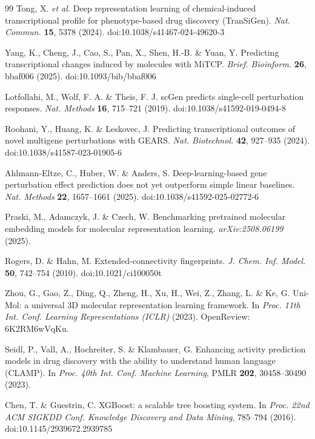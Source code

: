 \documentclass[11pt]{article}
\begin{document}
\begin{thebibliography}{99}
Tong, X. \textit{et al.} Deep representation learning of chemical-induced
transcriptional profile for phenotype-based drug discovery (TranSiGen).
\textit{Nat. Commun.} \textbf{15}, 5378 (2024).
doi:10.1038/s41467-024-49620-3

Yang, K., Cheng, J., Cao, S., Pan, X., Shen, H.-B. \& Yuan, Y. Predicting
transcriptional changes induced by molecules with MiTCP. \textit{Brief.
Bioinform.} \textbf{26}, bbaf006 (2025). doi:10.1093/bib/bbaf006

Lotfollahi, M., Wolf, F. A. \& Theis, F. J. scGen predicts single-cell
perturbation responses. \textit{Nat. Methods} \textbf{16}, 715--721 (2019).
doi:10.1038/s41592-019-0494-8

Roohani, Y., Huang, K. \& Leskovec, J. Predicting transcriptional outcomes of
novel multigene perturbations with GEARS. \textit{Nat. Biotechnol.}
\textbf{42}, 927--935 (2024). doi:10.1038/s41587-023-01905-6

Ahlmann-Eltze, C., Huber, W. \& Anders, S. Deep-learning-based gene
perturbation effect prediction does not yet outperform simple linear
baselines. \textit{Nat. Methods} \textbf{22}, 1657--1661 (2025).
doi:10.1038/s41592-025-02772-6

Praski, M., Adamczyk, J. \& Czech, W. Benchmarking pretrained molecular
embedding models for molecular representation learning.
\textit{arXiv:2508.06199} (2025).

Rogers, D. \& Hahn, M. Extended-connectivity fingerprints. \textit{J. Chem.
Inf. Model.} \textbf{50}, 742--754 (2010). doi:10.1021/ci100050t

Zhou, G., Gao, Z., Ding, Q., Zheng, H., Xu, H., Wei, Z., Zhang, L. \& Ke, G.
Uni-Mol: a universal 3D molecular representation learning framework. In
\textit{Proc. 11th Int. Conf. Learning Representations (ICLR)} (2023).
OpenReview: 6K2RM6wVqKu.

Seidl, P., Vall, A., Hochreiter, S. \& Klambauer, G. Enhancing activity
prediction models in drug discovery with the ability to understand human
language (CLAMP). In \textit{Proc. 40th Int. Conf. Machine Learning}, PMLR
\textbf{202}, 30458--30490 (2023).

Chen, T. \& Guestrin, C. XGBoost: a scalable tree boosting system. In
\textit{Proc. 22nd ACM SIGKDD Conf. Knowledge Discovery and Data Mining},
785--794 (2016). doi:10.1145/2939672.2939785


\end{thebibliography}
\end{document}
